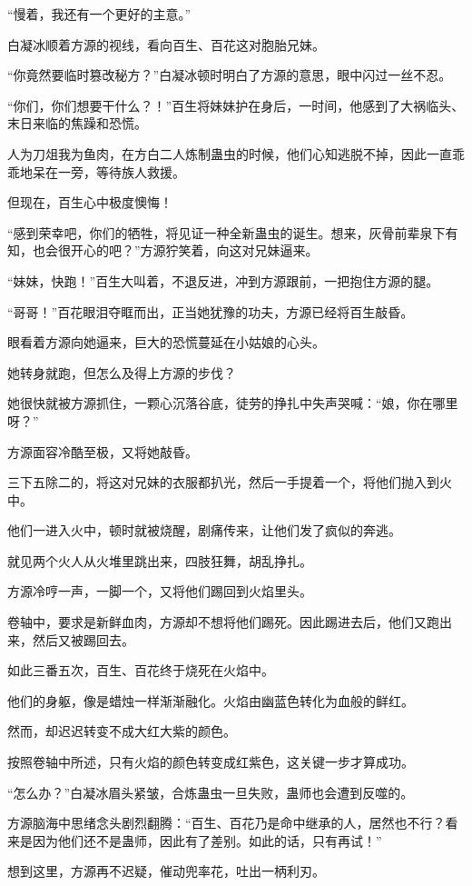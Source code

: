 \begin{this_body}
“慢着，我还有一个更好的主意。”

白凝冰顺着方源的视线，看向百生、百花这对胞胎兄妹。

“你竟然要临时篡改秘方？”白凝冰顿时明白了方源的意思，眼中闪过一丝不忍。

“你们，你们想要干什么？！”百生将妹妹护在身后，一时间，他感到了大祸临头、末日来临的焦躁和恐慌。

人为刀俎我为鱼肉，在方白二人炼制蛊虫的时候，他们心知逃脱不掉，因此一直乖乖地呆在一旁，等待族人救援。

但现在，百生心中极度懊悔！

“感到荣幸吧，你们的牺牲，将见证一种全新蛊虫的诞生。想来，灰骨前辈泉下有知，也会很开心的吧？”方源狞笑着，向这对兄妹逼来。

“妹妹，快跑！”百生大叫着，不退反进，冲到方源跟前，一把抱住方源的腿。

“哥哥！”百花眼泪夺眶而出，正当她犹豫的功夫，方源已经将百生敲昏。

眼看着方源向她逼来，巨大的恐慌蔓延在小姑娘的心头。

她转身就跑，但怎么及得上方源的步伐？

她很快就被方源抓住，一颗心沉落谷底，徒劳的挣扎中失声哭喊：“娘，你在哪里呀？”

方源面容冷酷至极，又将她敲昏。

三下五除二的，将这对兄妹的衣服都扒光，然后一手提着一个，将他们抛入到火中。

他们一进入火中，顿时就被烧醒，剧痛传来，让他们发了疯似的奔逃。

就见两个火人从火堆里跳出来，四肢狂舞，胡乱挣扎。

方源冷哼一声，一脚一个，又将他们踢回到火焰里头。

卷轴中，要求是新鲜血肉，方源却不想将他们踢死。因此踢进去后，他们又跑出来，然后又被踢回去。

如此三番五次，百生、百花终于烧死在火焰中。

他们的身躯，像是蜡烛一样渐渐融化。火焰由幽蓝色转化为血般的鲜红。

然而，却迟迟转变不成大红大紫的颜色。

按照卷轴中所述，只有火焰的颜色转变成红紫色，这关键一步才算成功。

“怎么办？”白凝冰眉头紧皱，合炼蛊虫一旦失败，蛊师也会遭到反噬的。

方源脑海中思绪念头剧烈翻腾：“百生、百花乃是命中继承的人，居然也不行？看来是因为他们还不是蛊师，因此有了差别。如此的话，只有再试！”

想到这里，方源再不迟疑，催动兜率花，吐出一柄利刃。


\end{this_body}
